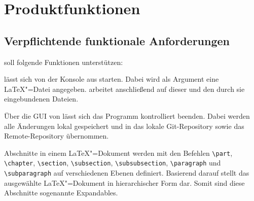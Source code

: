 \clearpage

\section{Produktfunktionen}
\label{sec:produktfunktionen}

\subsection{Verpflichtende funktionale Anforderungen}
\label{subsec:verpflichtende-funktionale-anforderungen}

\texla{} soll folgende Funktionen unterstützen:


\texla{} lässt sich von der Konsole aus starten.
Dabei wird als Argument eine \LaTeX"=Datei angegeben.
\texla{} arbeitet anschließend auf dieser und den durch sie eingebundenen Dateien.


Über die GUI von \texla{} lässt sich das Programm kontrolliert beenden.
Dabei werden alle Änderungen lokal gespeichert und in das lokale Git-Repository sowie das Remote-Repository übernommen.


Abschnitte in einem \LaTeX"=Dokument werden mit den Befehlen \verb|\part|, \verb|\chapter|, \verb|\section|,
\verb|\subsection|, \verb|\subsubsection|, \verb|\paragraph| und \verb|\subparagraph| auf verschiedenen Ebenen
definiert.
Basierend darauf stellt \texla{} das ausgewählte \LaTeX"=Dokument in hierarchischer Form dar.
Somit sind diese Abschnitte sogenannte Expandables.

